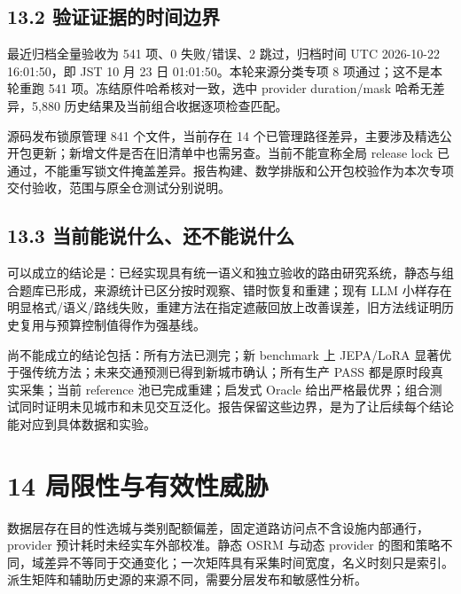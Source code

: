 \documentclass[UTF8,10pt,a4paper,fontset=fandol]{ctexart}
\begin{document}
\subsection*{13.2 验证证据的时间边界}


最近归档全量验收为 541 项、0 失败/\allowbreak{}错误、2 跳过，归档时间 UTC 2026-10-22 16:01:50，即 JST 10 月 23 日 01:01:50。本轮来源分类专项 8 项通过；这不是本轮重跑 541 项。冻结原件哈希核对一致，选中 provider duration/\allowbreak{}mask 哈希无差异，5,880 历史结果及当前组合收据逐项检查匹配。


源码发布锁原管理 841 个文件，当前存在 14 个已管理路径差异，主要涉及精选公开包更新；新增文件是否在旧清单中也需另查。当前不能宣称全局 release lock 已通过，不能重写锁文件掩盖差异。报告构建、数学排版和公开包校验作为本次专项交付验收，范围与原全仓测试分别说明。


\subsection*{13.3 当前能说什么、还不能说什么}


可以成立的结论是：已经实现具有统一语义和独立验收的路由研究系统，静态与组合题库已形成，来源统计已区分按时观察、错时恢复和重建；现有 LLM 小样存在明显格式/\allowbreak{}语义/\allowbreak{}路线失败，重建方法在指定遮蔽回放上改善误差，旧方法线证明历史复用与预算控制值得作为强基线。


尚不能成立的结论包括：所有方法已测完；新 benchmark 上 JEPA/\allowbreak{}LoRA 显著优于强传统方法；未来交通预测已得到新城市确认；所有生产 PASS 都是原时段真实采集；当前 reference 池已完成重建；启发式 Oracle 给出严格最优界；组合测试同时证明未见城市和未见交互泛化。报告保留这些边界，是为了让后续每个结论能对应到具体数据和实验。


\section*{14 局限性与有效性威胁}


数据层存在目的性选城与类别配额偏差，固定道路访问点不含设施内部通行，provider 预计耗时未经实车外部校准。静态 OSRM 与动态 provider 的图和策略不同，域差异不等同于交通变化；一次矩阵具有采集时间宽度，名义时刻只是索引。派生矩阵和辅助历史源的来源不同，需要分层发布和敏感性分析。
\end{document}

